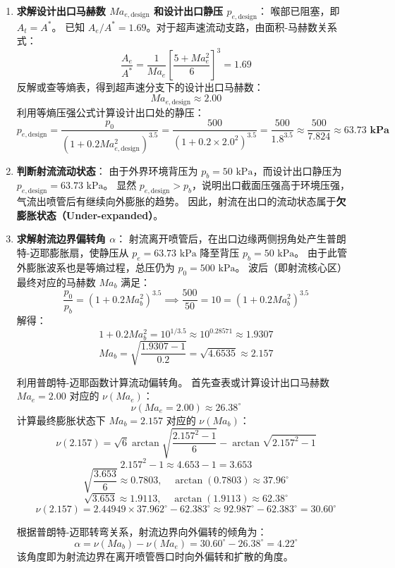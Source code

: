 \documentclass[11pt,a4paper]{ctexart}
\begin{document}
\begin{enumerate}
    \item \textbf{求解设计出口马赫数 $Ma_{e,\text{design}}$ 和设计出口静压 $p_{e,\text{design}}$}：
    喉部已阻塞，即 $A_t = A^*$。
    已知 $A_e/A^* = 1.69$。对于超声速流动支路，由面积-马赫数关系式：
    \[
    \frac{A_e}{A^*} = \frac{1}{Ma_e} \left[ \frac{5 + Ma_e^2}{6} \right]^3 = 1.69
    \]
    反解或查等熵表，得到超声速分支下的设计出口马赫数：
    \[
    Ma_{e,\text{design}} \approx 2.00
    \]
    利用等熵压强公式计算设计出口处的静压：
    \[
    p_{e,\text{design}} = \frac{p_0}{\left(1 + 0.2 Ma_{e,\text{design}}^2\right)^{3.5}} = \frac{500}{\left(1 + 0.2 \times 2.0^2\right)^{3.5}} = \frac{500}{1.8^{3.5}} \approx \frac{500}{7.824} \approx \mathbf{63.73\text{ kPa}}
    \]

    \item \textbf{判断射流流动状态}：
    由于外界环境背压为 $p_b = 50\text{ kPa}$，而设计出口静压为 $p_{e,\text{design}} = 63.73\text{ kPa}$。
    显然 $p_{e,\text{design}} > p_b$，说明出口截面压强高于环境压强，气流出喷管后有继续向外膨胀的趋势。
    因此，射流在出口的流动状态属于\textbf{欠膨胀状态（Under-expanded）}。

    \item \textbf{求解射流边界偏转角 $\alpha$}：
    射流离开喷管后，在出口边缘两侧拐角处产生普朗特-迈耶膨胀扇，使静压从 $p_e = 63.73\text{ kPa}$ 降至背压 $p_b = 50\text{ kPa}$。
    由于此管外膨胀波系也是等熵过程，总压仍为 $p_0 = 500\text{ kPa}$。
    波后（即射流核心区）最终对应的马赫数 $Ma_b$ 满足：
    \[
    \frac{p_0}{p_b} = \left(1 + 0.2 Ma_b^2\right)^{3.5} \implies \frac{500}{50} = 10 = \left(1 + 0.2 Ma_b^2\right)^{3.5}
    \]
    解得：
    \[
    1 + 0.2 Ma_b^2 = 10^{1/3.5} \approx 10^{0.28571} \approx 1.9307
    \]
    \[
    Ma_b = \sqrt{\frac{1.9307 - 1}{0.2}} = \sqrt{4.6535} \approx 2.157
    \]
    
    利用普朗特-迈耶函数计算流动偏转角。
    首先查表或计算设计出口马赫数 $Ma_e = 2.00$ 对应的 $\nu(Ma_e)$：
    \[
    \nu(Ma_e = 2.00) \approx 26.38^\circ
    \]
    计算最终膨胀状态下 $Ma_b = 2.157$ 对应的 $\nu(Ma_b)$：
    \[
    \nu(2.157) = \sqrt{6} \arctan \sqrt{\frac{2.157^2 - 1}{6}} - \arctan \sqrt{2.157^2 - 1}
    \]
    \[
    2.157^2 - 1 \approx 4.653 - 1 = 3.653
    \]
    \[
    \sqrt{\frac{3.653}{6}} \approx 0.7803, \quad \arctan(0.7803) \approx 37.96^\circ
    \]
    \[
    \sqrt{3.653} \approx 1.9113, \quad \arctan(1.9113) \approx 62.38^\circ
    \]
    \[
    \nu(2.157) = 2.44949 \times 37.962^\circ - 62.383^\circ \approx 92.987^\circ - 62.383^\circ = 30.60^\circ
    \]
    
    根据普朗特-迈耶转弯关系，射流边界向外偏转的倾角为：
    \[
    \alpha = \nu(Ma_b) - \nu(Ma_e) = 30.60^\circ - 26.38^\circ = \mathbf{4.22^\circ}
    \]
    该角度即为射流边界在离开喷管唇口时向外偏转和扩散的角度。
\end{enumerate}
\end{document}
